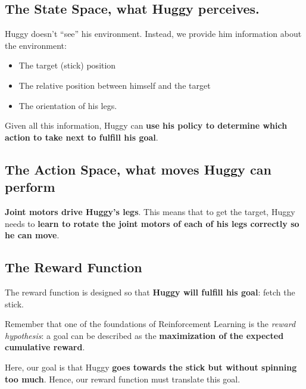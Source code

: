 \documentclass[11pt,a4paper]{article}
\begin{document}
\subsection{The State Space, what Huggy perceives.}\label{the-state-space-what-huggy-perceives.}

Huggy doesn't ``see'' his environment. Instead, we provide him information about the environment:

\begin{itemize}
\tightlist
\item
  The target (stick) position
\item
  The relative position between himself and the target
\item
  The orientation of his legs.
\end{itemize}

Given all this information, Huggy can \textbf{use his policy to determine which action to take next to fulfill his goal}.

\subsection{The Action Space, what moves Huggy can perform}\label{the-action-space-what-moves-huggy-can-perform}


\textbf{Joint motors drive Huggy's legs}. This means that to get the target, Huggy needs to \textbf{learn to rotate the joint motors of each of his legs correctly so he can move}.

\subsection{The Reward Function}\label{the-reward-function}

The reward function is designed so that \textbf{Huggy will fulfill his goal}: fetch the stick.

Remember that one of the foundations of Reinforcement Learning is the \emph{reward hypothesis}: a goal can be described as the \textbf{maximization of the expected cumulative reward}.

Here, our goal is that Huggy \textbf{goes towards the stick but without spinning too much}. Hence, our reward function must translate this goal.
\end{document}
